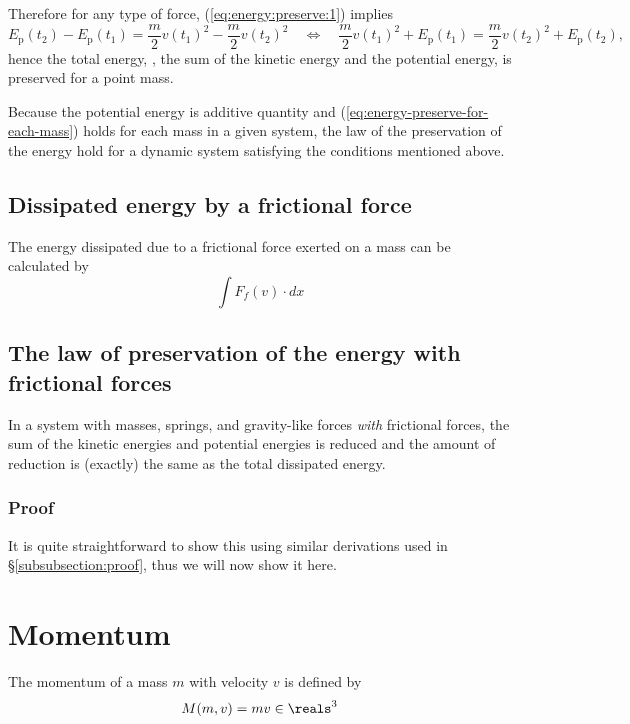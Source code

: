 \documentclass[12pt]{article}
\begin{document}
Therefore for any type of force,
(\ref{eq:energy:preserve:1})
implies
\begin{equation}
\label{eq:energy-preserve-for-each-mass}
E_\mathrm{p}(t_2) - E_\mathrm{p}(t_1)
=
\frac{m}{2} v(t_1)^2
- \frac{m}{2}v(t_2)^2
\quad
\Leftrightarrow
\quad
\frac{m}{2} v(t_1)^2 + E_\mathrm{p}(t_1)
=
\frac{m}{2} v(t_2)^2 + E_\mathrm{p}(t_2),
\end{equation}
hence the total energy,
\ie,
the sum of the kinetic energy and the potential energy,
is preserved for a point mass.

Because the potential energy is additive quantity
and (\ref{eq:energy-preserve-for-each-mass})
holds for each mass in a given system,
the law of the preservation of the energy hold
for a dynamic system satisfying the conditions mentioned above.


\subsection{Dissipated energy by a frictional force}

The energy dissipated due to a frictional force exerted on a mass
can be calculated by
\begin{equation}
\int F_f(v) \cdot dx
\end{equation}

\subsection{The law of preservation of the energy with frictional forces}

In a system with masses, springs, and gravity-like forces \emph{with} frictional forces,
the sum of the kinetic energies and potential energies is reduced
and the amount of reduction is (exactly) the same as the total dissipated energy.

\subsubsection{Proof}

It is quite straightforward to show this using similar derivations
used in \S\ref{subsubsection:proof},
thus we will now show it here.


\section{Momentum}

The momentum of a mass $m$ with velocity $v$ is defined by
\begin{equation}
M(m,v) = mv \in\reals^3
\end{equation}
\end{document}

